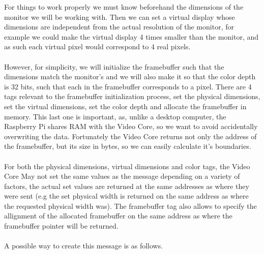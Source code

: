 \documentclass[12pt, svgnames]{book}
\begin{document}
\flushleft
For things to work properly we must know beforehand the dimensions of the monitor we will be working with. Then we can set a virtual display whose dimensions are independent from the actual resolution of the monitor, for example we could make the virtual display 4 times smaller than the monitor, and as such each virtual pixel would correspond to 4 real pixels.
\\~\\
However, for simplicity, we will initialize the framebuffer such that the dimensions match the monitor's and we will also make it so that the color depth is 32 bits, such that each  in the framebuffer corresponds to a pixel. There are 4 tags relevant to the framebuffer initialization process, set the physical dimensions, set the virtual dimensions, set the color depth and allocate the framebuffer in memory. This last one is important, as, unlike a desktop computer, the Raspberry Pi shares RAM with the Video Core, so we want to avoid  accidentally overwriting the data. Fortunately the Video Core returns not only the address of the framebuffer, but its size in bytes, so we can easily calculate it's boundaries.
\\~\\
For both the physical dimensions, virtual dimensions and color tags, the Video Core May not set the same values as the message depending on a variety of factors, the actual set values are returned at the same addresses as where they were sent (e.g the set physical width is returned on the same address as where the requested physical width was). The framebuffer tag also allows to specify the allignment of the allocated framebuffer on the same address as where the framebuffer pointer will be returned. 
\\~\\
A possible way to create this message is as follows.
\end{document}
